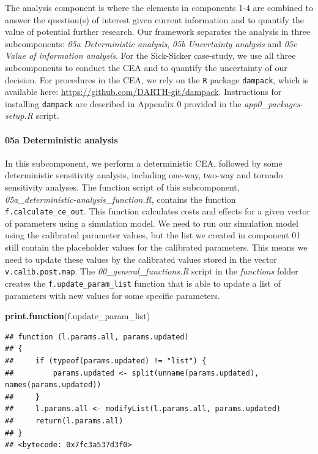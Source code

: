 \documentclass[]{article}
\newenvironment{Shaded}{\begin{snugshade}}{\end{snugshade}}
\newcommand{\KeywordTok}[1]{\textcolor[rgb]{0.13,0.29,0.53}{\textbf{#1}}}
\newcommand{\NormalTok}[1]{#1}
\let\oldparagraph\paragraph
\renewcommand{\paragraph}[1]{\oldparagraph{#1}\mbox{}}
\begin{document}
The analysis component is where the elements in components 1-4 are
combined to answer the question(s) of interest given current information
and to quantify the value of potential further research. Our framework
separates the analysis in three subcomponents: \emph{05a Deterministic
analysis}, \emph{05b Uncertainty analysis} and \emph{05c Value of
information analysis}. For the Sick-Sicker case-study, we use all three
subcomponents to conduct the CEA and to quantify the uncertainty of our
decision. For procedures in the CEA, we rely on the \texttt{R} package
\texttt{dampack}, which is available here:
\url{https://github.com/DARTH-git/dampack}. Instructions for installing
\texttt{dampack} are described in Appendix 0 provided in the
\emph{app0\_packages-setup.R} script.

\paragraph{05a Deterministic analysis}\label{a-deterministic-analysis}

In this subcomponent, we perform a deterministic CEA, followed by some
deterministic sensitivity analysis, including one-way, two-way and
tornado sensitivity analyses. The function script of this subcomponent,
\emph{05a\_deterministic-analysis\_function.R}, contains the function
\texttt{f.calculate\_ce\_out}. This function calculates costs and
effects for a given vector of parameters using a simulation model. We
need to run our simulation model using the calibrated parameter values,
but the list we created in component 01 still contain the placeholder
values for the calibrated parameters. This means we need to update these
values by the calibrated values stored in the vector
\texttt{v.calib.post.map}. The \emph{00\_general\_functions.R} script in
the \emph{functions} folder creates the \texttt{f.update\_param\_list}
function that is able to update a list of parameters with new values for
some specific parameters.

\begin{Shaded}
\begin{Highlighting}[]
\KeywordTok{print.function}\NormalTok{(f.update_param_list)}
\end{Highlighting}
\end{Shaded}

\begin{verbatim}
## function (l.params.all, params.updated) 
## {
##     if (typeof(params.updated) != "list") {
##         params.updated <- split(unname(params.updated), names(params.updated))
##     }
##     l.params.all <- modifyList(l.params.all, params.updated)
##     return(l.params.all)
## }
## <bytecode: 0x7fc3a537d3f0>
\end{verbatim}
\end{document}
